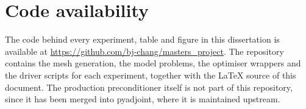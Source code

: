\documentclass[a4paper,11pt]{article}
\theoremstyle{spacedplain} \newtheorem{theorem}[counter]{Theorem} \newtheorem{lemma}[counter]{Lemma} \newtheorem{prop}[counter]{Proposition} \newtheorem{cor}[counter]{Corollary}
\theoremstyle{spaceddefinition} \newtheorem{defn}[counter]{Definition} \newtheorem{example}[counter]{Example} \newtheorem{remark}[counter]{Remark}
\begin{document}



\appendix
\section{Code availability}
\label{app:code}

The code behind every experiment, table and figure in this dissertation is available at \url{https://github.com/bj-chang/masters_project}. The repository contains the mesh generation, the model problems, the optimiser wrappers and the driver scripts for each experiment, together with the \LaTeX{} source of this document. The production preconditioner itself is not part of this repository, since it has been merged into pyadjoint, where it is maintained upstream.
\end{document}
